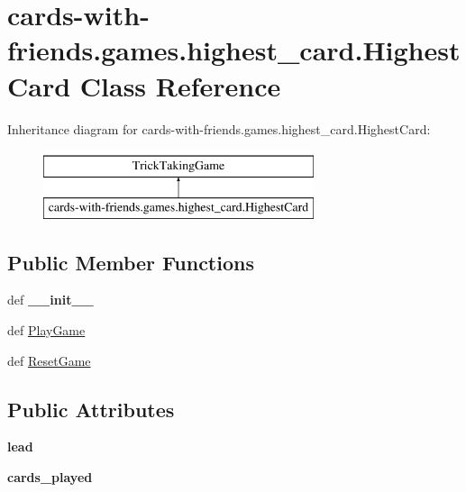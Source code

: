 \hypertarget{classcards-with-friends_1_1games_1_1highest__card_1_1_highest_card}{\section{cards-\/with-\/friends.games.\-highest\-\_\-card.\-Highest\-Card Class Reference}
\label{classcards-with-friends_1_1games_1_1highest__card_1_1_highest_card}
}
Inheritance diagram for cards-\/with-\/friends.games.\-highest\-\_\-card.\-Highest\-Card\-:\begin{figure}[H]
\begin{center}
\leavevmode
\includegraphics[height=2.000000cm]{classcards-with-friends_1_1games_1_1highest__card_1_1_highest_card}
\end{center}
\end{figure}
\subsection*{Public Member Functions}
\begin{DoxyCompactItemize}
\item 
\hypertarget{classcards-with-friends_1_1games_1_1highest__card_1_1_highest_card_a76637fdd046d57ca7304f94a7338130e}{def {\bfseries \-\_\-\-\_\-init\-\_\-\-\_\-}}\label{classcards-with-friends_1_1games_1_1highest__card_1_1_highest_card_a76637fdd046d57ca7304f94a7338130e}

\item 
def \hyperlink{classcards-with-friends_1_1games_1_1highest__card_1_1_highest_card_a791c4305e07baaa67c67d612ac39648d}{Play\-Game}
\item 
def \hyperlink{classcards-with-friends_1_1games_1_1highest__card_1_1_highest_card_ab6d86edce4aabd740bae250165bb8af9}{Reset\-Game}
\end{DoxyCompactItemize}
\subsection*{Public Attributes}
\begin{DoxyCompactItemize}
\item 
\hypertarget{classcards-with-friends_1_1games_1_1highest__card_1_1_highest_card_ab6be2dc24b7fc75d12acacf8295e0d9f}{{\bfseries lead}}\label{classcards-with-friends_1_1games_1_1highest__card_1_1_highest_card_ab6be2dc24b7fc75d12acacf8295e0d9f}

\item 
\hypertarget{classcards-with-friends_1_1games_1_1highest__card_1_1_highest_card_acf06e3e873edd041e5d5c80a2720a589}{{\bfseries cards\-\_\-played}}\label{classcards-with-friends_1_1games_1_1highest__card_1_1_highest_card_acf06e3e873edd041e5d5c80a2720a589}

\end{DoxyCompactItemize}


